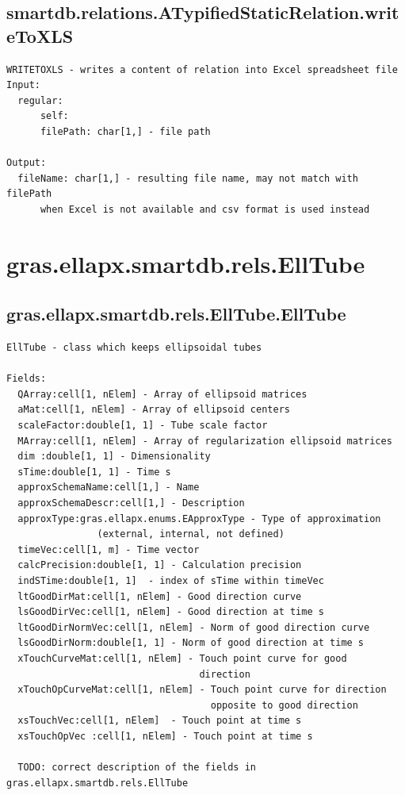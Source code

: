 \documentclass[letterpaper,10pt,english]{sphinxmanual}
\begin{document}
\subsection{smartdb.relations.ATypifiedStaticRelation.writeToXLS}
\label{chap_functions:smartdb-relations-atypifiedstaticrelation-writetoxls}
\begin{Verbatim}[commandchars=\\\{\}]
WRITETOXLS - writes a content of relation into Excel spreadsheet file
Input:
  regular:
      self:
      filePath: char[1,] - file path

Output:
  fileName: char[1,] - resulting file name, may not match with filePath
      when Excel is not available and csv format is used instead
\end{Verbatim}


\section{gras.ellapx.smartdb.rels.EllTube}
\label{chap_functions:gras-ellapx-smartdb-rels-elltube}

\subsection{gras.ellapx.smartdb.rels.EllTube.EllTube}
\label{chap_functions:gras-ellapx-smartdb-rels-elltube-elltube}
\begin{Verbatim}[commandchars=\\\{\}]
EllTube - class which keeps ellipsoidal tubes

Fields:
  QArray:cell[1, nElem] - Array of ellipsoid matrices
  aMat:cell[1, nElem] - Array of ellipsoid centers
  scaleFactor:double[1, 1] - Tube scale factor
  MArray:cell[1, nElem] - Array of regularization ellipsoid matrices
  dim :double[1, 1] - Dimensionality
  sTime:double[1, 1] - Time s
  approxSchemaName:cell[1,] - Name
  approxSchemaDescr:cell[1,] - Description
  approxType:gras.ellapx.enums.EApproxType - Type of approximation
                (external, internal, not defined)
  timeVec:cell[1, m] - Time vector
  calcPrecision:double[1, 1] - Calculation precision
  indSTime:double[1, 1]  - index of sTime within timeVec
  ltGoodDirMat:cell[1, nElem] - Good direction curve
  lsGoodDirVec:cell[1, nElem] - Good direction at time s
  ltGoodDirNormVec:cell[1, nElem] - Norm of good direction curve
  lsGoodDirNorm:double[1, 1] - Norm of good direction at time s
  xTouchCurveMat:cell[1, nElem] - Touch point curve for good
                                  direction
  xTouchOpCurveMat:cell[1, nElem] - Touch point curve for direction
                                    opposite to good direction
  xsTouchVec:cell[1, nElem]  - Touch point at time s
  xsTouchOpVec :cell[1, nElem] - Touch point at time s

  TODO: correct description of the fields in gras.ellapx.smartdb.rels.EllTube
\end{Verbatim}
\end{document}
